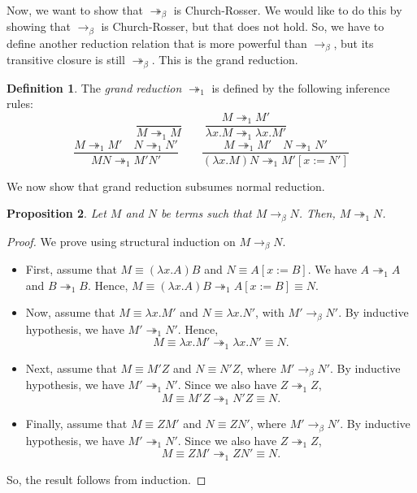 \documentclass[a4paper, openany]{memoir}
\newtheorem{proposition}{Proposition}[section]
\theoremstyle{definition}
\newtheorem{definition}[proposition]{Definition}
\begin{document}
    Now, we want to show that $\twoheadrightarrow_\beta$ is Church-Rosser. We would like to do this by showing that $\to_\beta$ is Church-Rosser, but that does not hold. So, we have to define another reduction relation that is more powerful than $\to_\beta$, but its transitive closure is still $\twoheadrightarrow_\beta$. This is the grand reduction.
    \begin{definition}
        The \emph{grand reduction} $\twoheadrightarrow_1$ is defined by the following inference rules:
        \[\frac{}{M \twoheadrightarrow_1 M} \qquad \frac{M \twoheadrightarrow_1 M'}{\lambda x.M \twoheadrightarrow_1 \lambda x.M'}\]
        \[\frac{M \twoheadrightarrow_1 M' \quad N \twoheadrightarrow_1 N'}{MN \twoheadrightarrow_1 M'N'} \qquad \frac{M \twoheadrightarrow_1 M' \quad N \twoheadrightarrow_1 N'}{(\lambda x.M)N \twoheadrightarrow_1 M'[x := N']}\]
    \end{definition}

    We now show that grand reduction subsumes normal reduction.
    \begin{proposition}
        Let $M$ and $N$ be terms such that $M \to_\beta N$. Then, $M \twoheadrightarrow_1 N$.
    \end{proposition}
    \begin{proof}
        We prove using structural induction on $M \to_\beta N$.
        \begin{itemize}
            \item First, assume that $M \equiv (\lambda x.A)B$ and $N \equiv A[x := B]$. We have $A \twoheadrightarrow_1 A$ and $B \twoheadrightarrow_1 B$. Hence, $M \equiv (\lambda x.A)B \twoheadrightarrow_1 A[x := B] \equiv N$.
            
            \item Now, assume that $M \equiv \lambda x.M'$ and $N \equiv \lambda x.N'$, with $M' \to_\beta N'$. By inductive hypothesis, we have $M' \twoheadrightarrow_1 N'$. Hence, 
            \[M \equiv \lambda x.M' \twoheadrightarrow_1 \lambda x.N' \equiv N.\]

            \item Next, assume that $M \equiv M'Z$ and $N \equiv N'Z$, where $M' \to_\beta N'$. By inductive hypothesis, we have $M' \twoheadrightarrow_1 N'$. Since we also have $Z \twoheadrightarrow_1 Z$, 
            \[M \equiv M'Z \twoheadrightarrow_1 N'Z \equiv N.\]

            \item Finally, assume that $M \equiv ZM'$ and $N \equiv ZN'$, where $M' \to_\beta N'$. By inductive hypothesis, we have $M' \twoheadrightarrow_1 N'$. Since we also have $Z \twoheadrightarrow_1 Z$,
            \[M \equiv ZM' \twoheadrightarrow_1 ZN' \equiv N.\]
        \end{itemize}
        So, the result follows from induction.
    \end{proof}
\end{document}
